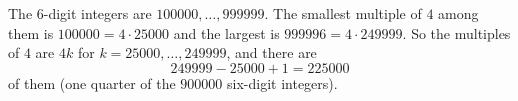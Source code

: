 The $6$-digit integers are $100000,\dots,999999$. The smallest multiple of $4$ among them is $100000=4\cdot25000$ and the largest is $999996=4\cdot249999$. So the multiples of $4$ are $4k$ for $k=25000,\dots,249999$, and there are
\[249999-25000+1=\boxed{225000}\]
of them (one quarter of the $900000$ six-digit integers).

